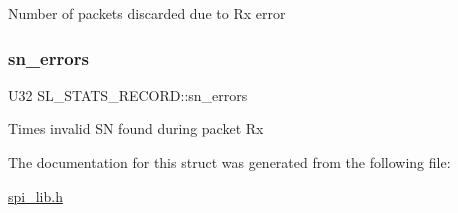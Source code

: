 Number of packets discarded due to Rx error \mbox{\label{structSL__STATS__RECORD_a3cbb616dbd6a162a89aead77f01f6d1c}} 
\subsubsection{\texorpdfstring{sn\+\_\+errors}{sn\_errors}}
{\footnotesize\ttfamily U32 S\+L\+\_\+\+S\+T\+A\+T\+S\+\_\+\+R\+E\+C\+O\+R\+D\+::sn\+\_\+errors}

Times invalid SN found during packet Rx 

The documentation for this struct was generated from the following file\+:\begin{DoxyCompactItemize}
\item 
\mbox{\hyperlink{spi__lib_8h}{spi\+\_\+lib.\+h}}\end{DoxyCompactItemize}

